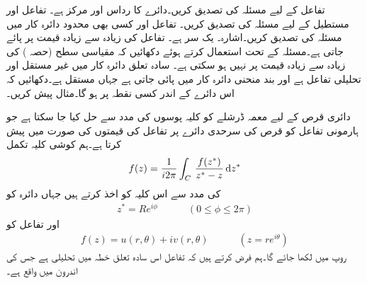 
\quad
تفاعل  کے لیے مسئلہ  کی تصدیق کریں۔دائرے کا رداس  اور مرکز  ہے۔
\quad
تفاعل  اور مستطیل  کے لیے مسئلہ  کی تصدیق کریں۔
\quad
تفاعل  اور کسی بھی محدود دائرہ کار میں مسئلہ  کی تصدیق کریں۔اشارہ۔  یک سر ہے۔
\quad
تفاعل  کی زیادہ سے زیادہ قیمت  پر پائے جاتی ہے۔مسئلہ  کے تحت استعمال کرتے ہوئے دکھائیں کہ  مقیاسی سطح   (حصہ ) کی زیادہ سے زیادہ قیمت  پر نہیں ہو سکتی ہے۔
\quad
سادہ تعلق دائرہ کار  میں  غیر مستقل اور تحلیلی تفاعل ہے اور بند منحنی  دائرہ کار  میں پائی جاتی ہے جہاں  مستقل ہے۔دکھائیں کہ  اس دائرے کے اندر کسی نقطہ پر ہو گا۔مثال پیش کریں۔

دائری قرص کے لیے معمہ ڈرشلے کو کلیہ پوسوں کی مدد سے حل کیا جا سکتا ہے جو ہارمونی تفاعل کو قرص کی سرحدی دائرے پر تفاعل کی قیمتوں کی صورت میں پیش کرتا ہے۔ہم کوشی کلیہ تکمل
\begin{align}\label{مساوات_مخفی_معمہ_الف}
f(z)=\frac{1}{i2\pi}\int_C\,\frac{f(z^*)}{z^*-z}\dif z^*
\end{align}
 کی مدد سے اس کلیہ کو اخذ کرتے ہیں جہاں دائرہ  کو
\begin{align*}
z^*=Re^{i\phi}\quad\quad\quad (0\le \phi\le 2\pi)
\end{align*}
اور تفاعل کو
\begin{align*}
f(z)=u(r,\theta)+iv(r,\theta)\quad \quad \quad (z=re^{i\theta})
\end{align*}
روپ میں لکھا جائے گا۔ہم فرض کرتے ہیں کہ تفاعل اس سادہ تعلق خطہ میں تحلیلی ہے جس کی اندرون میں  واقع ہے۔

